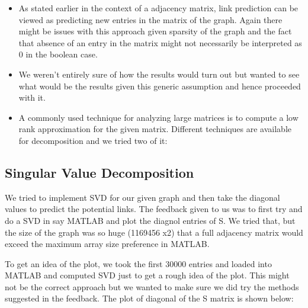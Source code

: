 \documentclass[letterpaper,twocolumn,11pt]{article}
\begin{document}
\begin{itemize}
\item As stated earlier in the context of a adjacency matrix, link prediction can be viewed as predicting new entries in the matrix of the graph. Again there might be issues with this approach given sparsity of the graph and the fact that absence of an entry in the matrix might not necessarily be interpreted as 0 in the boolean case. 

\item We weren't entirely sure of how the results would turn out but wanted to see what would be the results given this generic assumption and hence proceeded with it.

\item A commonly used technique for analyzing large matrices is to compute a low rank approximation for the given matrix. Different techniques are available for decomposition and we tried two of it:
\end{itemize}

\subsection{Singular Value Decomposition}

We tried to implement SVD for our given graph and then take the diagonal values to predict the potential links. The feedback given to us was to first try and do a SVD in say MATLAB and plot the diagnol entries of S. We tried that, but the size of the graph was so huge (1169456 x2) that a full adjacency matrix would exceed the maximum array size preference in MATLAB. 

To get an idea of the plot, we took the first 30000 entries and loaded into MATLAB and computed SVD just to get a rough idea of the plot. This might not be the correct approach but we wanted to make sure we did try the methods suggested in the feedback. The plot of diagonal  of the S matrix is shown below:
\end{document}
